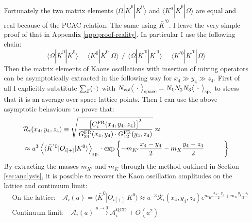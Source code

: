 \documentclass[english, LaM, oneside, noexaminfo]{sapthesis}
\newcommand{\la}{\langle}
\newcommand{\ra}{\rangle}
\begin{document}
Fortunately the two matrix elements $\la \Omega | \bar K^0 | \bar K^0 \ra$ and $\la K^0 | \bar K^0 | \Omega \ra$ are equal and real because of the PCAC relation.
The same using $\bar K^{'0}$.
I leave the very simple proof of that in Appendix \ref{app:proof-reality}.
In particular I use the following chain:
$$\la \Omega | \bar K^0 | \bar K^0 \ra = \la K^0 | \bar K^0 | \Omega \ra \neq \la \Omega | \bar K^{'0} | \bar K^{'0} \ra = \la K^{'0} | \bar K^{'0} | \Omega \ra$$
Then the matrix elements of Kaons oscillations with insertion of mixing operators can be asymptotically extracted in the following way for $x_4 \gg y_4 \gg z_4$.
First of all I explicitly substitute $\sum_{\vec{x}} \la \hspace*{.5mm} \cdot \hspace*{.5mm} \ra$ with $N_\text{vol} \big\la \hspace*{.5mm} \cdot \hspace*{.5mm} \big\ra_\text{space} = N_1 N_2 N_3 \big\la \hspace*{.5mm} \cdot \hspace*{.5mm} \big\ra_\text{sp.}$ to stress that it is an average over space lattice points.
Then I can use the above asymptotic behaviours to prove that:
\begin{equation*}
    \begin{split}
        & \mathcal{R}_i (x_4,y_4,z_4) \equiv \sqrt{\frac{\left[C_i^\text{FR}(x_4,y_4,z_4)\right]^2}{G_{34}^\text{FR}(x_4,y_4) \cdot G_{12}^\text{FR}(y_4,z_4)}} \approx \\
        & \hspace*{1cm \approx a^3 \left\la \la \bar K^{'0} | O_{i[+]} | K^0 \ra \right\ra_\text{sp.}\cdot \text{exp}\left\{ -m_{K'}\frac{x_4-y_4}{2} - m_{K}\frac{y_4-z_4}{2}}\right\}
    \end{split}
\end{equation*}
By extracting the masses $m_{K'}$ and $m_K$ through the method outlined in Section \ref{sec:analysis}, it is possible to recover the Kaon oscillation amplitudes on the lattice and continuum limit:
\begin{equation}\label{eq:matrix-elements-extraction}
    \begin{split}
        & \text{On the lattice:} \quad \mathcal{A}_i (a) = \la \bar K^0 | O_{i[+]} | K^0 \ra \approx a^{-3} \mathcal{R}_i (x_4,y_4,z_4) e^{m_{K'}\frac{x_4-y_4}{2} + m_{K}\frac{y_4-z_4}{2}} \\[5pt]
        & \text{Continuum limit:} \quad \mathcal{A}_i (a) \xrightarrow{a \rightarrow 0} \mathcal{A}_i^\text{QCD} + O(a^2)
    \end{split}
\end{equation}
\end{document}
